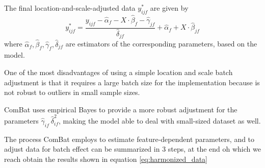 \documentclass[10pt]{report}
\begin{document}
The final location-and-scale-adjusted data $y^{\ast}_{ijf}$ are given by
\begin{equation}\label{eq:harmonized_data}
y^{\ast}_{ijf} = \frac{y_{ijf} - \hat \alpha_f - X\cdot \hat \beta_f - \hat \gamma_{jf}}{\hat \delta_{jf}} + \hat \alpha_f + X \cdot \hat \beta_{jf}
\end{equation}
where $\hat \alpha_f , \hat \beta_f , \hat \gamma_f ,  \hat \delta_{jf}$ are estimators of the corresponding parameters, based on the model.

One of the most disadvantages of using a simple location and scale batch adjustment is that it requires a large batch size for the implementation because is not robust to outliers in small sample sizes.

ComBat uses empirical Bayes to provide a more robust adjustment for the parameters $\hat \gamma_{if} \ \hat \delta^2_{if}$, making the model able to deal with small-sized dataset as well.


The process ComBat employs to estimate feature-dependent parameters, and to adjust data for batch effect can be summarized in 3 steps, at the end oh which we reach obtain the results shown in equation \ref{eq:harmonized_data}
\end{document}
